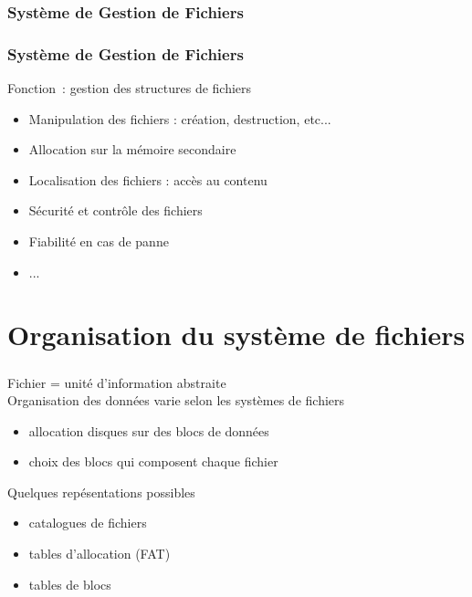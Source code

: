 \subsubsection{Système de Gestion de Fichiers}
\begin{frame}
\frametitle{Système de Gestion de Fichiers}
Fonction~: gestion des structures de fichiers 
\begin{itemize}\item Manipulation des fichiers : création, destruction, etc... 
\item Allocation sur la mémoire secondaire 
\item Localisation des fichiers : accès au contenu
\item Sécurité et contrôle des fichiers
\item Fiabilité en cas de panne
\item ...
\end{itemize}
\end{frame}

\section{Organisation du système de fichiers}
\begin{frame}
  \frametitle{\insertsection}
  Fichier = unité d'information abstraite\\
  \vspace{0.5cm}
  Organisation des données varie selon les systèmes de fichiers\\
  \begin{itemize}
  \item allocation disques sur des \alert{blocs} de données 
  \item[\ding{212}] choix des blocs qui composent chaque fichier 
  \end{itemize}
  \vspace{0.5cm}
  Quelques repésentations possibles
  \begin{itemize}
  \item catalogues de fichiers
  \item tables d'allocation (FAT) 
  \item tables de blocs 
  \end{itemize}
\end{frame}

